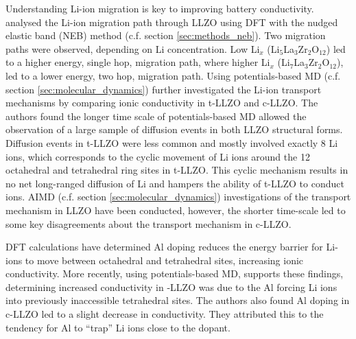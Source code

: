 \documentclass[../main.tex]{subfiles}
\begin{document}
Understanding Li-ion migration is key to improving battery conductivity. \citeauthor{Xu2012} analysed the Li-ion migration path through LLZO using DFT with the nudged elastic band (NEB) method (c.f. section \ref{sec:methods_neb}).\cite{Xu2012} Two migration paths were observed, depending on Li concentration. Low Li$_x$ (Li$_5$La$_3$Zr$_2$O$_{12}$) led to a higher energy, single hop, migration path, where higher Li$_x$ (Li$_7$La$_3$Zr$_2$O$_{12}$), led to a lower energy, two hop, migration path. Using potentials-based MD (c.f. section \ref{sec:molecular_dynamics}) \citeauthor{Burbano2016} further investigated the Li-ion transport mechanisms by comparing ionic conductivity in t-LLZO and c-LLZO.\cite{Burbano2016} The authors found the longer time scale of potentials-based MD allowed the observation of a large sample of diffusion events in both LLZO structural forms. Diffusion events in t-LLZO were less common and mostly involved exactly 8 Li ions, which corresponds to the cyclic movement of Li ions around the 12 octahedral and tetrahedral ring sites in t-LLZO. This cyclic mechanism results in no net long-ranged diffusion of Li and hampers the ability of t-LLZO to conduct ions. AIMD (c.f. section \ref{sec:molecular_dynamics}) investigations of the transport mechanism in LLZO have been conducted, however, the shorter time-scale led to some key disagreements about the transport mechanism in c-LLZO.\cite{Meier2014, Jalem2013, Burbano2016}

DFT calculations have determined Al doping reduces the energy barrier for Li-ions to move between octahedral and tetrahedral sites, increasing ionic conductivity.\cite{Rettenwander2014, Rettenwander2016} More recently, using potentials-based MD, \citeauthor{Bonilla2019} supports these findings, determining increased conductivity in -LLZO was due to the Al forcing Li ions into previously inaccessible tetrahedral sites.\cite{Bonilla2019} The authors also found Al doping in c-LLZO led to a slight decrease in conductivity. They attributed this to the tendency for Al to ``trap'' Li ions close to the dopant.
\end{document}
